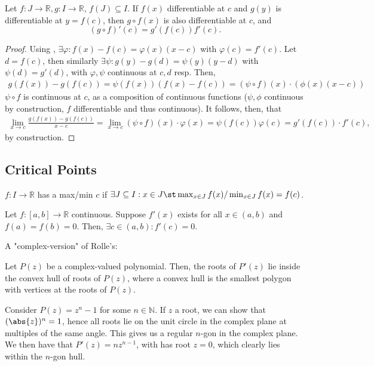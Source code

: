 \begin{theorem}
    Let $f : J \to \mathbb{R}, g : I \to \mathbb{R}$, $f(J) \subseteq I$. If $f(x)$ differentiable at $c$ and $g(y)$ is differentiable at $y = f(c)$, then $g \circ f(x)$ is also differentiable at $c$, and \[
    (g\circ f)'(c) = g'(f(c))f'(c).    
    \]
\end{theorem}

\begin{proof}
    Using , $\exists \varphi : f(x) - f(c) = \varphi(x)(x-c)$ with $\varphi(c) = f'(c)$. Let $d = f(c)$, then similarly $\exists \psi :g(y)-g(d) = \psi(y)(y-d)$ with $\psi(d) = g'(d)$, with $\varphi, \psi$ continuous at $c, d$ resp. Then, \begin{align*}
        g(f(x))-g(f(c)) = \psi(f(x))(f(x)-f(c))=(\psi\circ f)(x)\cdot(\phi(x)(x-c))
    \end{align*}
    $\psi \circ f$ is continuous at $c$, as a composition of continuous functions ($\psi, \phi$ continuous by construction, $f$ differentiable and thus continuous). It follows, then, that \begin{align*}
        \lim_{x \to c} \frac{g(f(x)) - g(f(c))}{x - c} = \lim_{x \to c} (\psi\circ f)(x)\cdot\varphi(x) = \psi(f(c))\varphi(c) = g'(f(c))\cdot f'(c),
    \end{align*}
    by construction.
\end{proof}

\subsection{Critical Points}

\begin{definition}
    $f: I \to \mathbb{R}$ has a max/min $c$ if $\exists J \subseteq I : x \in J \st \max_{x \in J} f(x) /\min_{x \in J}f(x)= f(c)$.
\end{definition}

\begin{theorem}[Rolle's]\label{thm:rolles}
    Let $f:[a,b]\to \mathbb{R}$ continuous. Suppose $f'(x)$ exists for all $x \in (a,b)$ and $f(a) = f(b) = 0$. Then, $\exists c \in (a, b) : f'(c) = 0$.
\end{theorem}
\begin{remark}
    A "complex-version" of Rolle's:
\end{remark}

\begin{theorem}
   Let $P(z)$ be a complex-valued polynomial. Then, the roots of $P'(z)$ lie inside the convex hull of roots of $P(z)$, where a convex hull is the smallest polygon with vertices at the roots of $P(z)$.
\end{theorem}
\begin{definition}
    Consider $P(z) = z^{n} - 1$ for some $n \in \mathbb{N}$. If $z$ a root, we can show that $(\abs{z})^n = 1$, hence all roots lie on the unit circle in the complex plane at multiples of the same angle. This gives us a regular $n$-gon in the complex plane. We then have that $P'(z) = nz^{n-1}$, with has root $z = 0$, which clearly lies within the $n$-gon hull.
\end{definition}

